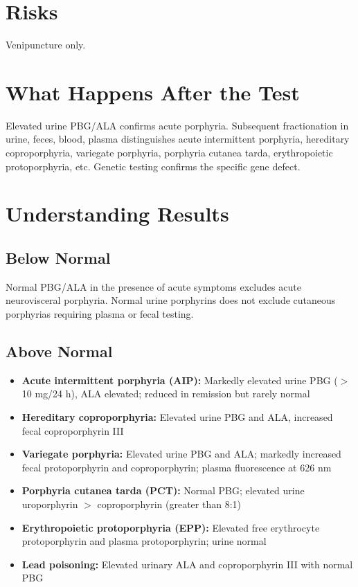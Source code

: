 \section*{Risks}
Venipuncture only.

\section*{What Happens After the Test}
Elevated urine PBG/ALA confirms acute porphyria. Subsequent fractionation in urine, feces, blood, plasma distinguishes acute intermittent porphyria, hereditary coproporphyria, variegate porphyria, porphyria cutanea tarda, erythropoietic protoporphyria, etc. Genetic testing confirms the specific gene defect.

\section*{Understanding Results}

\subsection*{Below Normal}
Normal PBG/ALA in the presence of acute symptoms excludes acute neurovisceral porphyria. Normal urine porphyrins does not exclude cutaneous porphyrias requiring plasma or fecal testing.

\subsection*{Above Normal}
\begin{itemize}
  \item \textbf{Acute intermittent porphyria (AIP):} Markedly elevated urine PBG ($>$ 10 mg/24 h), ALA elevated; reduced in remission but rarely normal
  \item \textbf{Hereditary coproporphyria:} Elevated urine PBG and ALA, increased fecal coproporphyrin III
  \item \textbf{Variegate porphyria:} Elevated urine PBG and ALA; markedly increased fecal protoporphyrin and coproporphyrin; plasma fluorescence at 626 nm
  \item \textbf{Porphyria cutanea tarda (PCT):} Normal PBG; elevated urine uroporphyrin $>$ coproporphyrin (greater than 8:1)
  \item \textbf{Erythropoietic protoporphyria (EPP):} Elevated free erythrocyte protoporphyrin and plasma protoporphyrin; urine normal
  \item \textbf{Lead poisoning:} Elevated urinary ALA and coproporphyrin III with normal PBG
\end{itemize}

